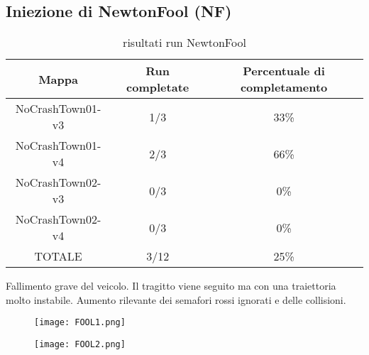 \subsection{Iniezione di NewtonFool (NF)}
\begin{table}[h!]
    \begin{tabular}{|c|c|c|}
        \hline
        Mappa                   & Run completate & Percentuale di completamento\\
        \hline
        NoCrashTown01-v3        & 1/3            & 33\% \\
        NoCrashTown01-v4        & 2/3            & 66\% \\
        NoCrashTown02-v3        & 0/3            & 0\% \\
        NoCrashTown02-v4        & 0/3            & 0\%  \\
        TOTALE                  & 3/12           & 25\% \\
        \hline
    \end{tabular}
    \caption{risultati run NewtonFool}
    \label{tab:nf}
\end{table}
Fallimento grave del veicolo. Il tragitto viene seguito ma con una traiettoria molto instabile. Aumento rilevante dei semafori rossi ignorati e delle collisioni.
\begin{figure}[h]
    \centering
    \parbox{6cm}{
    \texttt{[image: FOOL1.png]}
    \label{fig:fool1}}
    \qquad
    \begin{minipage}{6cm}
    \texttt{[image: FOOL2.png]}
    \label{fig:fool2}
    \end{minipage}
    \label{fig:foolrun}
    \end{figure}

